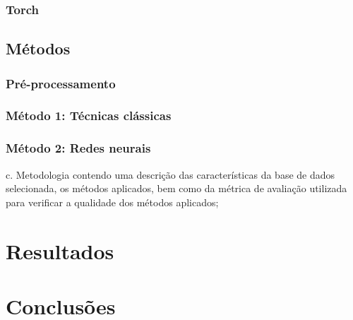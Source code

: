 \documentclass[12pt]{article}
\begin{document}
\subsubsection{Torch}

\subsection{Métodos} \label{sec:metodos}

\subsubsection{Pré-processamento} \label{sec:preproc}

\subsubsection{Método 1: Técnicas clássicas}

\subsubsection{Método 2: Redes neurais}

c. Metodologia contendo uma descrição das características da base de dados selecionada,
os métodos aplicados, bem como da métrica de avaliação utilizada para verificar a
qualidade dos métodos aplicados;

\section{Resultados}

\section{Conclusões}



\end{document}
